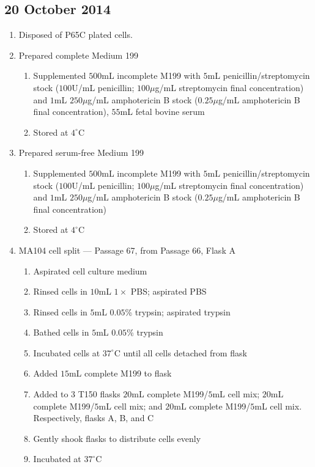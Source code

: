 
\subsection*{20 October 2014}

\begin{enumerate}
	\item Disposed of P65C plated cells.
	
	\item Prepared complete Medium 199
		\begin{enumerate}
				\item Supplemented $500$mL incomplete M199 with $5$mL penicillin/streptomycin stock ($100$U/mL penicillin; $100\mu$g/mL streptomycin final concentration) and $1$mL $250\mu$g/mL amphotericin B stock ($0.25\mu$g/mL amphotericin B final concentration), $55$mL fetal bovine serum
				\item Stored at $4^{\circ}$C
		\end{enumerate}
	\item Prepared serum-free Medium 199
		\begin{enumerate}
			\item Supplemented $500$mL incomplete M199 with $5$mL penicillin/streptomycin stock ($100$U/mL penicillin; $100\mu$g/mL streptomycin final concentration) and $1$mL $250\mu$g/mL amphotericin B stock ($0.25\mu$g/mL amphotericin B final concentration)
			\item Stored at $4^{\circ}$C
		\end{enumerate}

	\item MA104 cell split --- Passage 67, from Passage 66, Flask A
		\begin{enumerate}
			\item Aspirated cell culture medium
			\item Rinsed cells in $10$mL $1\times$ PBS; aspirated PBS
			\item Rinsed cells in $5$mL $0.05$\% trypsin; aspirated trypsin
			\item Bathed cells in $5$mL $0.05$\% trypsin
			\item Incubated cells at $37^{\circ}$C until all cells detached from flask
			\item Added $15$mL complete M199 to flask
			\item Added to $3$ T150 flasks $20$mL complete M199/$5$mL cell mix; $20$mL complete M199/$5$mL cell mix; and $20$mL complete M199/$5$mL cell mix. Respectively, flasks A, B, and C
			\item Gently shook flasks to distribute cells evenly
			\item Incubated at $37^{\circ}$C
		\end{enumerate}
	

\end{enumerate}
